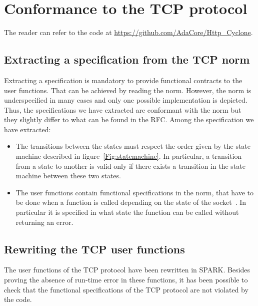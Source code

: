 \documentclass[conference]{IEEEtran}
\begin{document}
\section{Conformance to the TCP protocol}
\label{sec:verif}

The reader can refer to the code at \url{https://github.com/AdaCore/Http_Cyclone}.


\subsection{Extracting a specification from the TCP norm}

Extracting a specification
is mandatory to provide functional contracts to the user functions. That can
be achieved by reading the norm. However, the norm is underspecified in many
cases and only one possible implementation is depicted. Thus, the specifications
we have extracted are conformant with the norm but they slightly differ to what
can be found in the RFC.
Among the specification we have extracted:
\begin{itemize}
\item The transitions between the states must respect the order given by the
state machine described in figure~\ref{Fig:statemachine}.
In particular, a transition from a state to
another is valid only if there exists a transition in the state machine between
these two states.
\item The user functions contain functional specifications in the norm, that
have to be done  when a function is called depending on the state of the
socket~\cite[p. 52]{rfc793}. In particular it is specified in what state the
function can be called without returning an error.
\end{itemize}

\subsection{Rewriting the TCP user functions}

The user functions of the TCP protocol have been rewritten in SPARK. Besides
proving the absence of run-time error in these functions, it has been possible
to check that the functional specifications of the TCP protocol are not violated
by the code.


\end{document}
